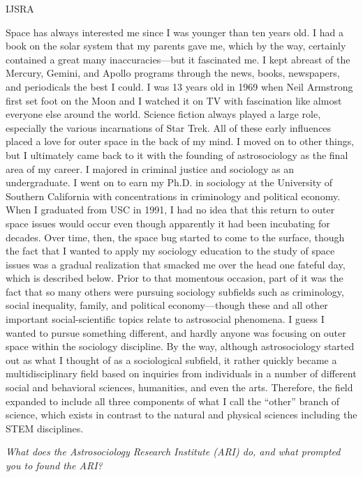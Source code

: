 \begin{labeling}{IJSRA}
	\item[JP] Space has always interested me since I was younger than ten years old. I had a book on the solar system that my parents gave me, which by the way, certainly contained a great many inaccuracies—but it fascinated me. I kept abreast of the Mercury, Gemini, and Apollo programs through the news, books, newspapers, and periodicals the best I could. I was 13 years old in 1969 when Neil Armstrong first set foot on the Moon and I watched it on TV with fascination like almost everyone else around the world. Science fiction always played a large role, especially the various incarnations of Star Trek. All of these early influences placed a love for outer space in the back of my mind. I moved on to other things, but I ultimately came back to it with the founding of astrosociology as the final area of my career. I majored in criminal justice and sociology as an undergraduate. I went on to earn my Ph.D. in sociology at the University of Southern California with concentrations in criminology and political economy. When I graduated from USC in 1991, I had no idea that this return to outer space issues would occur even though apparently it had been incubating for decades. Over time, then, the space bug started to come to the surface, though the fact that I wanted to apply my sociology education to the study of space issues was a gradual realization that smacked me over the head one fateful day, which is described below. Prior to that momentous occasion, part of it was the fact that so many others were pursuing sociology subfields such as criminology, social inequality, family, and political economy—though these and all other important social-scientific topics relate to astrosocial phenomena. I guess I wanted to pursue something different, and hardly anyone was focusing on outer space within the sociology discipline. By the way, although astrosociology started out as what I thought of as a sociological subfield, it rather quickly became a multidisciplinary field based on inquiries from individuals in a number of different social and behavioral sciences, humanities, and even the arts. Therefore, the field expanded to include all three components of what I call the “other” branch of science, which exists in contrast to the natural and physical sciences including the STEM disciplines.

	\item[IJSRA] \emph{What does the Astrosociology Research Institute (ARI) do, and what prompted you to found the ARI?}


\end{labeling}
